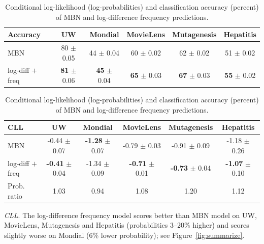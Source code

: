 \documentclass[twoside,11pt]{article}
\newcommand{\point}[1]{\noindent\emph{#1}.}
\begin{document}
\begin{table}[thbp]

\caption{Conditional log-likelihood (log-probabilities) and classification accuracy (percent) of MBN and log-difference frequency predictions.}

\begin{center}

\begin{tabular}{|l|c|c|c|c|c|}
\hline
Accuracy& UW & Mondial & MovieLens & Mutagenesis & Hepatitis \\\hline
MBN & 80 $\pm$ 0.05 & 44 $\pm$ 0.04 & 60 $\pm$ 0.02 & 62 $\pm$ 0.02 & 51 $\pm$ 0.02 \\\hline
log-diff $+$ freq & \textbf{81} $\pm$ 0.06 & \textbf{45} $\pm$ 0.04 & \textbf{65} $\pm$ 0.03 & \textbf{67} $\pm$ 0.03 & \textbf{55} $\pm$ 0.02 \\
\hline
\end{tabular}
\end{center}


\begin{center}
\begin{tabular}{|l|c|c|c|c|c|}
\hline
CLL & UW & Mondial & MovieLens & Mutagenesis & Hepatitis \\\hline
MBN & -0.44 $\pm$ 0.07 & \textbf{-1.28} $\pm$ 0.07 & -0.79 $\pm$ 0.03 & -0.91 $\pm$ 0.09 & -1.18 $\pm$ 0.26 \\
log-diff $+$ freq & \textbf{-0.41} $\pm$ 0.04 & -1.34 $\pm$ 0.09 & \textbf{-0.71} $\pm$ 0.01 & \textbf{-0.73} $\pm$ 0.04 & \textbf{-1.07} $\pm$ 0.10 \\
Prob. ratio & 1.03 & 0.94 & 1.08 & 1.20 & 1.12\\
\hline
\end{tabular}
\end{center}
\label{table:mbn}

\end{table}%


\point{CLL}
The log-difference frequency  model scores better than MBN model on UW, MovieLens, Mutagenesis and Hepatitis (probabilities 3--20\% higher) and scores slightly worse on Mondial (6\% lower probability); see Figure~\ref{fig:summarize}.
\end{document}
